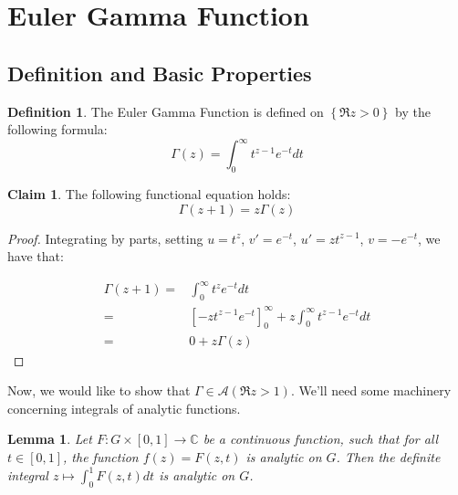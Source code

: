 \documentclass[11pt]{article} %
\newtheorem{lemma}[theorem]{Lemma}
\theoremstyle{definition}
\newtheorem{definition}[theorem]{Definition}
\newtheorem{claim}[theorem]{Claim}
\begin{document}
\section{Euler Gamma Function}

\subsection{Definition and Basic Properties}

\begin{definition}
The Euler Gamma Function is defined on $\left\{\Re z > 0\right\}$ by the following formula:
\[ \Gamma \left(z\right) = \int_0^\infty t^{z-1}e^{-t}dt \]
\end{definition}

\begin{claim}
The following functional equation holds:
\[ \Gamma \left(z+1\right) = z \Gamma\left(z\right) \]
\end{claim}

\begin{proof}
Integrating by parts, setting $u = t^z$, $v' = e^{-t}$, $u' = zt^{z-1}$, $v = -e^{-t}$, we have that:

\[
\begin{split}
\Gamma\left(z+1\right) = & \int_0^\infty t^z e^{-t}dt \\
= & \left[-zt^{z-1}e^{-t}\right]_0^\infty + z\int_0^\infty t^{z-1}e^{-t}dt \\
= & 0 + z\Gamma\left(z\right)
\end{split}
\]
\end{proof}

Now, we would like to show that $\Gamma \in \mathcal{A}\left(\Re z > 1\right)$. We'll need some machinery concerning integrals of analytic functions.

\begin{lemma}
Let $F : G \times \left[0,1\right] \to \mathbb{C}$ be a continuous function, such that for all $t \in \left[0,1\right]$, the function $f\left(z\right) = F\left(z,t\right)$ is analytic on $G$. Then the definite integral $z \mapsto \int_0^1 F\left(z,t\right)dt$ is analytic on $G$.
\end{lemma}
\end{document}
